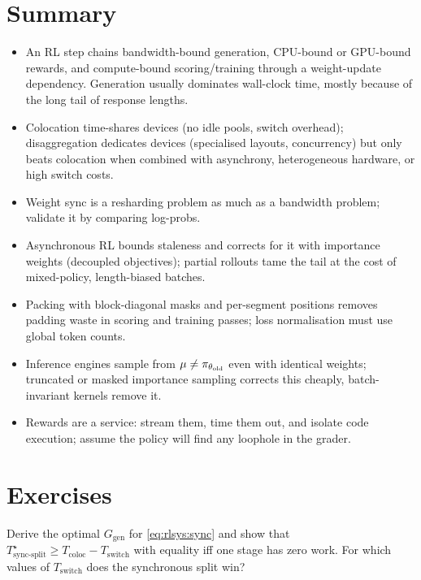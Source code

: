 \section{Summary}\label{sec:rlsys:summary}
\begin{itemize}
\item An RL step chains bandwidth-bound generation, CPU-bound or GPU-bound rewards, and
compute-bound scoring/training through a weight-update dependency. Generation usually
dominates wall-clock time, mostly because of the long tail of response lengths.
\item Colocation time-shares devices (no idle pools, switch overhead); disaggregation
dedicates devices (specialised layouts, concurrency) but only beats colocation when combined
with asynchrony, heterogeneous hardware, or high switch costs.
\item Weight sync is a resharding problem as much as a bandwidth problem; validate it by
comparing log-probs.
\item Asynchronous RL bounds staleness and corrects for it with importance weights (decoupled
objectives); partial rollouts tame the tail at the cost of mixed-policy, length-biased batches.
\item Packing with block-diagonal masks and per-segment positions removes padding waste in
scoring and training passes; loss normalisation must use global token counts.
\item Inference engines sample from $\mu\neq\pi_{\theta_{\text{old}}}$ even with identical weights; truncated or
masked importance sampling corrects this cheaply, batch-invariant kernels remove it.
\item Rewards are a service: stream them, time them out, and isolate code execution; assume the
policy will find any loophole in the grader.
\end{itemize}

\section{Exercises}\label{sec:rlsys:exercises}

\begin{exercise}
Derive the optimal $G_{\text{gen}}$ for \cref{eq:rlsys:sync} and show that
$T^\star_{\text{sync-split}} \ge T_{\text{coloc}} - T_{\text{switch}}$ with equality iff one stage
has zero work. For which values of $T_{\text{switch}}$ does the synchronous split win?
\end{exercise}

